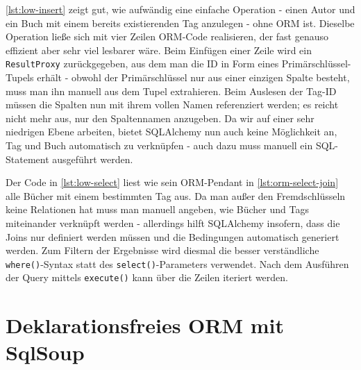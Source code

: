 \autoref{lst:low-insert} zeigt gut, wie aufwändig eine einfache Operation -
einen Autor und ein Buch mit einem bereits existierenden Tag anzulegen - ohne
ORM ist. Dieselbe Operation ließe sich mit vier Zeilen ORM-Code realisieren, der
fast genauso effizient aber sehr viel lesbarer wäre.
Beim Einfügen einer Zeile wird ein \texttt{ResultProxy} zurückgegeben, aus dem
man die ID in Form eines Primärschlüssel-Tupels erhält - obwohl der
Primärschlüssel nur aus einer einzigen Spalte besteht, muss man ihn manuell aus
dem Tupel extrahieren. Beim Auslesen der Tag-ID müssen die Spalten nun mit ihrem
vollen Namen referenziert werden; es reicht nicht mehr aus, nur den Spaltennamen
anzugeben. Da wir auf einer sehr niedrigen Ebene arbeiten, bietet SQLAlchemy nun
auch keine Möglichkeit an, Tag und Buch automatisch zu verknüpfen - auch dazu
muss manuell ein SQL-Statement ausgeführt werden.



Der Code in \autoref{lst:low-select} liest wie sein ORM-Pendant in
\autoref{lst:orm-select-join} alle Bücher mit einem bestimmten Tag aus. Da man
außer den Fremdschlüsseln keine Relationen hat muss man manuell angeben, wie
Bücher und Tags miteinander verknüpft werden - allerdings hilft SQLAlchemy
insofern, dass die Joins nur definiert werden müssen und die Bedingungen
automatisch generiert werden. Zum Filtern der Ergebnisse wird diesmal die besser
verständliche \texttt{where()}-Syntax statt des \texttt{select()}-Parameters
verwendet. Nach dem Ausführen der Query mittels \texttt{execute()} kann über die
Zeilen iteriert werden.



\section{Deklarationsfreies ORM mit SqlSoup}

